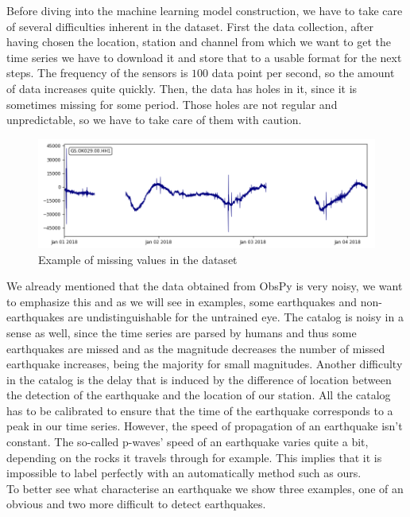 \documentclass[10pt,conference,compsocconf]{IEEEtran}
\begin{document}
Before diving into the machine learning model construction, we have to take care of several difficulties inherent in the dataset.\newline
First the data collection, after having chosen the location, station and channel from which we want to get the time series we have to download it and store that to a usable format for the next steps. The frequency of the sensors is $100$ data point per second, so the amount of data increases quite quickly. Then, the data has holes in it, since it is sometimes missing for some period. Those holes are not regular and unpredictable, so we have to take care of them with caution.

\begin{figure}[h]
  \centering
	\includegraphics[width=\columnwidth]{hole_example.png}
  \caption{Example of missing values in the dataset}
	\label{fig:10min-example}
\end{figure}

We already mentioned that the data obtained from ObsPy is very noisy, we want to emphasize this and as we will see in examples, some earthquakes and non-earthquakes are undistinguishable for the untrained eye. The catalog is noisy in a sense as well, since the time series are parsed by humans and thus some earthquakes are missed and as the magnitude decreases the number of missed earthquake increases, being the majority for small magnitudes. Another difficulty in the catalog is the delay that is induced by the difference of location between the detection of the earthquake and the location of our station. All the catalog has to be calibrated to ensure that the time of the earthquake corresponds to a peak in our time series. However, the speed of propagation of an earthquake isn't constant. The so-called p-waves' speed of an earthquake varies quite a bit, depending on the rocks it travels through for example. This implies that it is impossible to label perfectly with an automatically method such as ours.\\
To better see what characterise an earthquake we show three examples, one of an obvious and two more difficult to detect earthquakes.
\end{document}
